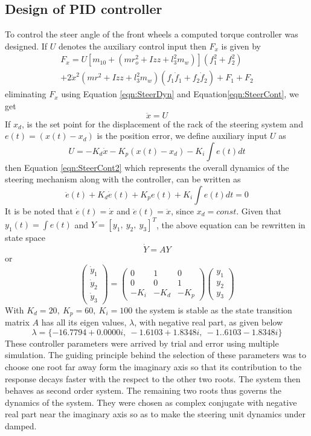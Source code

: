 \subsection{Design of PID controller}
To control the steer angle of the front wheels a computed torque controller \cite{craig2005introduction} was designed. If $U$ denotes the auxiliary control input then $F_x$ is given by
\begin{multline}
\label{eqn:SteerCont}
F_x=U\left[ m_{10}+\left(mr_o^2+I{zz}+l^2_3m_w \right) \right] \left( f_1^2+f_2^2 \right)\\
+2\dot x^2 \left(mr^2+I{zz}+l_3^2 m_w \right) \left( f_1 \dot f_1 +f_2 \dot f_2\right) 
+F_1+F_2
\end{multline}
eliminating  $F_x$ using Equation \ref{eqn:SteerDyn} and Equation\ref{eqn:SteerCont}, we get
\begin{equation}
\label{eqn:SteerCont2}
\ddot x =U
\end{equation}
If $x_d$, is the set point for the displacement of the rack of the steering system and $e(t)=(x(t)-x_d)$ is the position error, we define auxiliary input $U$ as  
\begin{equation}
\label{eqn:SteerCont3}
 U=-K_d \dot x -K_p \left(x(t)-x_d \right) -K_i\int e(t)dt \end{equation}
then Equation \ref{eqn:SteerCont2} which represents the overall dynamics of the steering mechanism along with the controller, can  be written as 
\[\ddot e(t) +K_d \dot{e}(t) +K_p e(t)+ K_i\int e(t)dt=0 \]
It is be noted that $\dot e(t)=\dot x$ and $\ddot e(t)=\ddot x$, since $x_d=const$. Given that  $y_1(t)= \int e(t)$ and $Y=[y_1,~y_2,~y_3]^T$, the above equation can be rewritten in state space \[\dot{Y}=AY\] or
\begin{equation}
\begin{pmatrix}
\dot y_1 \\ \dot y_2 \\\dot y_3
\end{pmatrix}
=
\begin{pmatrix}
0 & 1 & 0\\ 0 & 0 & 1\\ -K_i & -K_d & -K_p
\end{pmatrix}
\begin{pmatrix}
 y_1 \\ y_2 \\ y_3
\end{pmatrix}
\end{equation}
With $K_d=20,~K_p=60,~K_i=100 $ the system is stable as  the state transition matrix $A$ has all its eigen values, $\lambda$, with negative real part, as given below 
\[ \lambda= \{-16.7794 + 0.0000i, ~ -1.6103 + 1.8348i, ~ -1..6103 - 1.8348i\}\]
 These controller parameters were arrived by trial and error using multiple simulation. The guiding principle behind the selection of these parameters was to choose one root far away form the imaginary axis so that its contribution to the response decays faster with the respect to  the other two roots.  The system then behaves as second order system. The remaining two roots thus governs the dynamics of the system.  They were chosen as complex conjugate with negative real part near the imaginary axis so as to make the steering unit dynamics  under damped.

